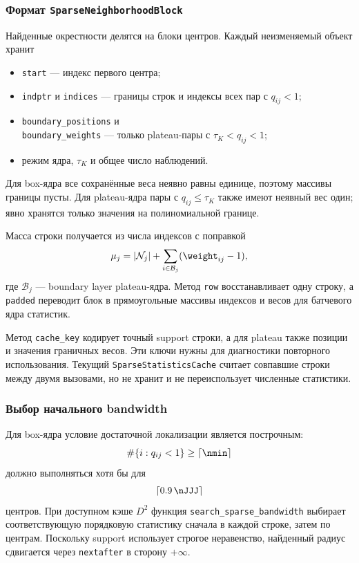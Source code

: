 \subsubsection{Формат \texttt{SparseNeighborhoodBlock}}

Найденные окрестности делятся на блоки центров. Каждый неизменяемый
объект хранит
\begin{itemize}
\item \texttt{start} --- индекс первого центра;
\item \texttt{indptr} и \texttt{indices} --- границы строк и индексы
      всех пар с $q_{ij}<1$;
\item \texttt{boundary\_positions} и\\
      \texttt{boundary\_weights} --- только plateau-пары с
      $\tau_K<q_{ij}<1$;
\item режим ядра, $\tau_K$ и общее число наблюдений.
\end{itemize}
Для box-ядра все сохранённые веса неявно равны единице, поэтому
массивы границы пусты. Для plateau-ядра пары с $q_{ij}\leq\tau_K$
также имеют неявный вес один; явно хранятся только значения на
полиномиальной границе.

Масса строки получается из числа индексов с поправкой
\begin{equation}
    \mu_j
    =|\mathcal N_j|
     +\sum_{i\in\mathcal B_j}(\weight_{ij}-1),
\end{equation}
где $\mathcal B_j$ --- boundary layer plateau-ядра. Метод
\texttt{row} восстанавливает одну строку, а \texttt{padded}
переводит блок в прямоугольные массивы индексов и весов для
батчевого ядра статистик.

Метод \texttt{cache\_key} кодирует точный support строки, а для
plateau также позиции и значения граничных весов. Эти ключи нужны
для диагностики повторного использования. Текущий
\texttt{SparseStatisticsCache} считает совпавшие строки между двумя
вызовами, но не хранит и не переиспользует численные статистики.

\subsubsection{Выбор начального bandwidth}

Для box-ядра условие достаточной локализации является построчным:
\begin{equation}
    \#\{i:q_{ij}<1\}\geq\lceil\nmin\rceil
\end{equation}
должно выполняться хотя бы для
\begin{equation}
    \left\lceil0.9\,\nJJJ\right\rceil
\end{equation}
центров. При доступном кэше $D^2$ функция
\texttt{search\_sparse\_bandwidth} выбирает соответствующую
порядковую статистику сначала в каждой строке, затем по центрам.
Поскольку support использует строгое неравенство, найденный радиус
сдвигается через \texttt{nextafter} в сторону $+\infty$.

